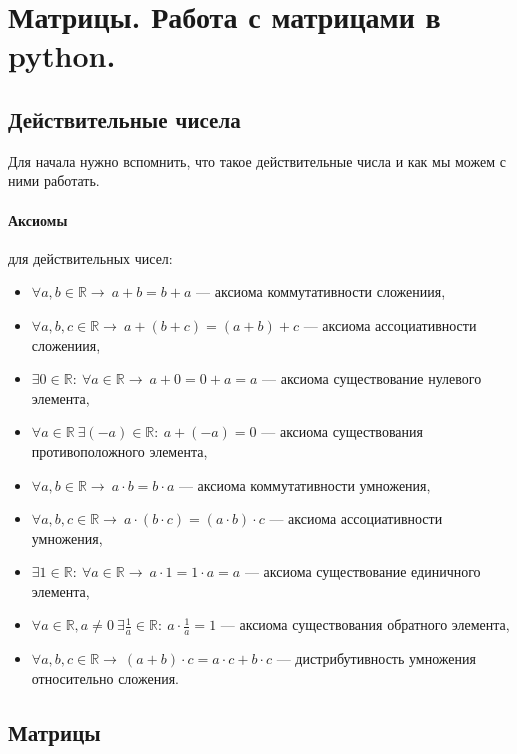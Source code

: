 \section{Матрицы. Работа с матрицами в python.}

\subsection{Действительные чисела}
Для начала нужно вспомнить, что такое действительные числа и как мы можем с ними работать.
\paragraph{Аксиомы} для действительных чисел:
\begin{itemize}
	\item $\forall a,b \in \mathbb{R}\rightarrow~a+b=b+a$ --- аксиома коммутативности сложениия,
	\item $\forall a,b,c \in \mathbb{R}\rightarrow~a+(b+c)=(a+b)+c$ --- аксиома ассоциативности сложениия,
	\item $\exists 0 \in \mathbb{R}:~\forall a \in \mathbb{R}\rightarrow~a+0=0+a=a$ --- аксиома существование нулевого элемента,
	\item $\forall a \in \mathbb{R}~\exists(-a)\in\mathbb{R}:~a+(-a)=0$ --- аксиома существования противоположного элемента,
	
	\item $\forall a,b \in \mathbb{R}\rightarrow~a\cdot b=b\cdot a$ --- аксиома коммутативности умножения,
	\item $\forall a,b,c \in \mathbb{R}\rightarrow~a\cdot(b\cdot c)=(a\cdot b)\cdot c$ --- аксиома ассоциативности умножения,
	\item $\exists 1 \in \mathbb{R}:~\forall a \in \mathbb{R}\rightarrow~a\cdot1=1\cdot a=a$ --- аксиома существование единичного элемента,
	\item $\forall a \in \mathbb{R}, a\not=0~\exists\frac{1}{a}\in\mathbb{R}:~a\cdot\frac{1}{a}=1$ --- аксиома существования обратного элемента,
	
	\item $\forall a,b,c \in \mathbb{R} \rightarrow~ (a+b)\cdot c = a\cdot c + b\cdot c$ --- дистрибутивность умножения относительно сложения.
\end{itemize}

\subsection{Матрицы}

